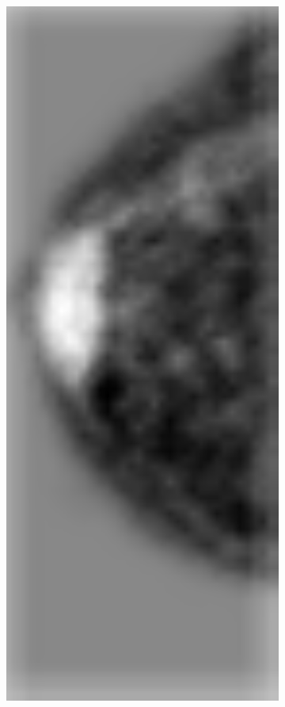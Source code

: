 \begin{figure}[h]
	\centering
	\begin{subfigure}{0.17\textwidth}
		\centering
                \includegraphics[width=\textwidth]{plots/logits.png}

\end{subfigure}
\end{figure}
